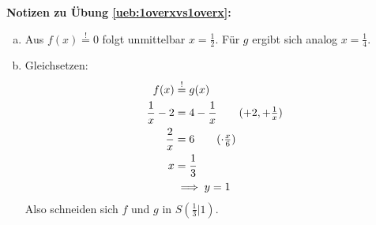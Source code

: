 \documentclass[%
11pt,%
twoside,%
titlepage,%
german,%
headsepline%
]{scrartcl}
\newcommand{\concatueb}[1]{ueb:#1}%
\newcommand{\concatlsg}[1]{lsg:#1}%
\newenvironment{lsg}[1]{%
    \par\noindent\textbf{Notizen zu Übung \ref{\concatueb{#1}}:}%
    \label{\concatlsg{#1}}\par
}{%
    \par%
}
\begin{document}
\begin{lsg}{1overxvs1overx}
  \begin{enumerate}[a)]
    \item Aus $f(x)\stackrel{!}{=}0$ folgt unmittelbar $x=\frac{1}{2}$. Für $g$ ergibt sich analog $x=\frac{1}{4}$.
    \item Gleichsetzen:
    \begin{align}
      f(x)&\stackrel{!}{=} g(x)\\
      \frac{1}{x}-2 &= 4-\frac{1}{x}\tag{$+2,+\frac{1}{x}$}\\
      \frac{2}{x} &= 6\tag{$\cdot\frac{x}{6}$}\\
      x &= \frac{1}{3}\\
      &\implies y=1
    \end{align}
    Also schneiden sich $f$ und $g$ in $S(\frac{1}{3}|1)$.
  \end{enumerate}
\end{lsg}


\end{document}
